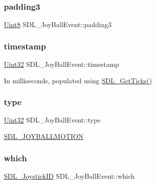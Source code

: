 \subsubsection{\texorpdfstring{padding3}{padding3}}
{\footnotesize\ttfamily \mbox{\hyperlink{_s_d_l__stdinc_8h_a2944638813a090aa23e62f4da842c3e2}{Uint8}} S\+D\+L\+\_\+\+Joy\+Ball\+Event\+::padding3}

\mbox{\label{struct_s_d_l___joy_ball_event_aa8e4fb91af62e316bb9a3219ab76148d}} 
\subsubsection{\texorpdfstring{timestamp}{timestamp}}
{\footnotesize\ttfamily \mbox{\hyperlink{_s_d_l__stdinc_8h_add440eff171ea5f55cb00c4a9ab8672d}{Uint32}} S\+D\+L\+\_\+\+Joy\+Ball\+Event\+::timestamp}

In milliseconds, populated using \mbox{\hyperlink{_s_d_l__timer_8h_a0b9bc71d6287e0ffafdc3419760fe2b3}{S\+D\+L\+\_\+\+Get\+Ticks()}} \mbox{\label{struct_s_d_l___joy_ball_event_a0b192b95a043cb494b27ed9b27e84db1}} 
\subsubsection{\texorpdfstring{type}{type}}
{\footnotesize\ttfamily \mbox{\hyperlink{_s_d_l__stdinc_8h_add440eff171ea5f55cb00c4a9ab8672d}{Uint32}} S\+D\+L\+\_\+\+Joy\+Ball\+Event\+::type}

\mbox{\hyperlink{_s_d_l__events_8h_a3b589e89be6b35c02e0dd34a55f3fccaa78f859489cfd565c305c7f6f9d5b25c1}{S\+D\+L\+\_\+\+J\+O\+Y\+B\+A\+L\+L\+M\+O\+T\+I\+ON}} \mbox{\label{struct_s_d_l___joy_ball_event_a4e2e185717d529167cd0bea21093c454}} 
\subsubsection{\texorpdfstring{which}{which}}
{\footnotesize\ttfamily \mbox{\hyperlink{_s_d_l__joystick_8h_a3c3d32500cb08f76ee8077983912c0bd}{S\+D\+L\+\_\+\+Joystick\+ID}} S\+D\+L\+\_\+\+Joy\+Ball\+Event\+::which}

